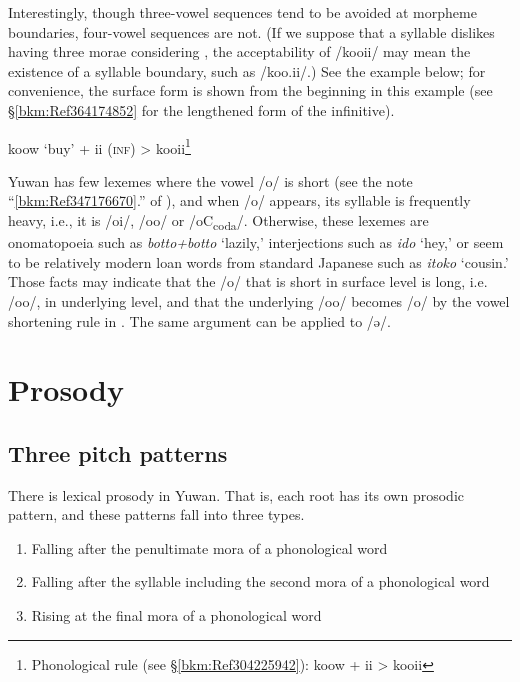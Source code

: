 Interestingly, though three-vowel sequences tend to be avoided at morpheme boundaries, four-vowel sequences are not. (If we suppose that a syllable dislikes having three morae considering , the acceptability of /kooii/ may mean the existence of a syllable boundary, such as /koo.ii/.) See the example below; for convenience, the surface form is shown from the beginning in this example (see §\ref{bkm:Ref364174852} for the lengthened form of the infinitive).

\ea koow  ‘buy’  +  ii  (\textsc{inf})  >  kooii\footnote{Phonological rule (see §\ref{bkm:Ref304225942}): koow + ii > kooii} \z

Yuwan has few lexemes where the vowel /o/ is short (see the note “\ref{bkm:Ref347176670}.” of ), and when /o/ appears, its syllable is frequently heavy, i.e., it is /oi/, /oo/ or /oC\textsubscript{coda}/. Otherwise, these lexemes are onomatopoeia such as \textit{botto+botto} ‘lazily,’ interjections such as \textit{ido} ‘hey,’ or seem to be relatively modern loan words from standard Japanese such as \textit{itoko} ‘cousin.’ Those facts may indicate that the /o/ that is short in surface level is long, i.e. /oo/, in underlying level, and that the underlying /oo/ becomes /o/ by the vowel shortening rule in . The same argument can be applied to /ə/.

\section{Prosody}\label{bkm:Ref301560567}\hypertarget{RefHeadingToc395696983}{}
\subsection{Three pitch patterns}\label{bkm:Ref303982713}\hypertarget{RefHeadingToc395696984}{}

There is lexical prosody in Yuwan. That is, each root has its own prosodic pattern, and these patterns fall into three types.

\begin{enumerate}[label=\Roman*.]
\item Falling after the penultimate mora of a phonological word
\item Falling after the syllable including the second mora of a phonological word
\item Rising at the final mora of a phonological word
\end{enumerate}

